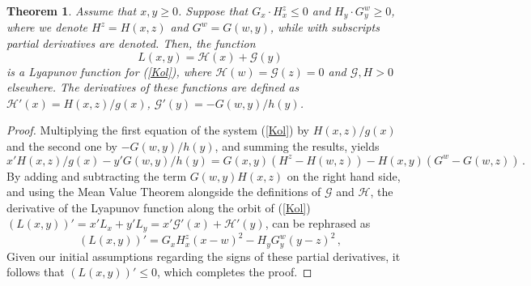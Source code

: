 \documentclass[10pt,a4paper]{amsart}
\newtheorem{theorem}{Theorem}
\begin{document}
\begin{theorem} \label{MyThmLabel} %
Assume that $x,y \ge 0$. Suppose that $G_x\cdot H_x^z \le 0$ and $H_y\cdot G_y^w\ge 0$, where we denote  $H^z=H(x,z)$ and $G^w=G(w,y)$, while with subscripts partial derivatives are denoted. Then, the function
\[L(x,y)={\mathcal H}(x)+{\mathcal G}(y)\] 
is a Lyapunov function for (\ref{Kol}), where ${\mathcal H}(w)={\mathcal G}(z)=0$ and ${\mathcal G, H}>0$ elsewhere. The derivatives of these functions are defined as ${\mathcal H}'(x)=H(x,z)/g(x)$, ${\mathcal G}'(y)=-G(w,y)/h(y)$. 
\end{theorem}

\begin{proof}
Multiplying the first equation of the system (\ref{Kol}) by $H(x,z)/g(x)$ and the second one by $-G(w,y)/h(y)$, and summing the results, yields
\[
x'H(x,z)/g(x)-y'G(w,y)/h(y)=G(x,y)(H^z-H(w,z))-H(x,y)(G^w-G(w,z))\,.
\]
By adding and subtracting the term $G(w,y)H(x,z)$ on the right hand side, and using the Mean Value Theorem alongside the definitions of ${\mathcal G}$ and ${\mathcal H}$, the derivative of the Lyapunov function along the orbit of (\ref{Kol}) $(L(x,y))'=x'L_x+y'L_y=x'{\mathcal G}'(x)+{\mathcal H}'(y)$, can be rephrased as
\[
(L(x,y))'=G_xH_x^z(x-w)^2-H_yG_y^w(y-z)^2\,,
\]
Given our initial assumptions regarding the signs of these partial derivatives, it follows that $(L(x,y))'\le 0$, which completes the proof.
\end{proof}
\end{document}
